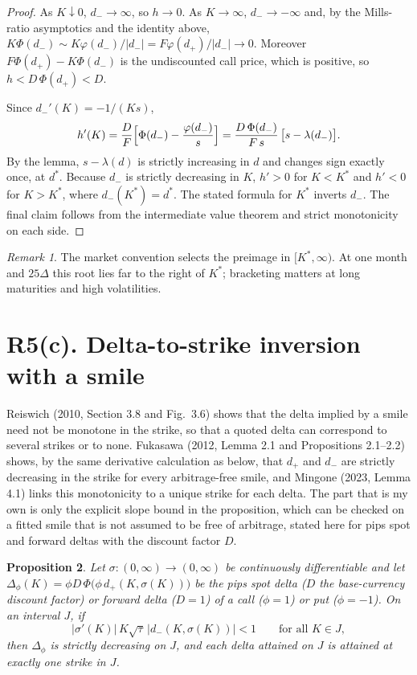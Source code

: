 \documentclass[11pt]{article}
\newtheorem{proposition}{Proposition}
\theoremstyle{remark}
\newtheorem{remark}[proposition]{Remark}
\begin{document}
\begin{proof}
As $K\downarrow0$, $d_-\to\infty$, so $h\to0$. As $K\to\infty$, $d_-\to-\infty$ and, by the Mills-ratio asymptotics and the identity above, $K\Phi(d_-)\sim K\varphi(d_-)/|d_-|=F\varphi(d_+)/|d_-|\to0$. Moreover $F\Phi(d_+)-K\Phi(d_-)$ is the undiscounted call price, which is positive, so $h<D\,\Phi(d_+)<D$.

Since $d_-'(K)=-1/(Ks)$,
\[
h'(K)=\frac{D}{F}\Bigl[\Phi(d_-)-\frac{\varphi(d_-)}{s}\Bigr]=\frac{D\,\Phi(d_-)}{F\,s}\,\bigl[s-\lambda(d_-)\bigr].
\]
By the lemma, $s-\lambda(d)$ is strictly increasing in $d$ and changes sign exactly once, at $d^*$. Because $d_-$ is strictly decreasing in $K$, $h'>0$ for $K<K^*$ and $h'<0$ for $K>K^*$, where $d_-(K^*)=d^*$. The stated formula for $K^*$ inverts $d_-$. The final claim follows from the intermediate value theorem and strict monotonicity on each side.
\end{proof}

\begin{remark}
The market convention selects the preimage in $[K^*,\infty)$. At one month and $25\Delta$ this root lies far to the right of $K^*$; bracketing matters at long maturities and high volatilities.
\end{remark}

\section*{R5(c). Delta-to-strike inversion with a smile}

Reiswich (2010, Section 3.8 and Fig.~3.6) shows that the delta implied by a smile need not be monotone in the strike, so that a quoted delta can correspond to several strikes or to none. Fukasawa (2012, Lemma 2.1 and Propositions 2.1--2.2) shows, by the same derivative calculation as below, that $d_+$ and $d_-$ are strictly decreasing in the strike for every arbitrage-free smile, and Mingone (2023, Lemma 4.1) links this monotonicity to a unique strike for each delta. The part that is my own is only the explicit slope bound in the proposition, which can be checked on a fitted smile that is not assumed to be free of arbitrage, stated here for pips spot and forward deltas with the discount factor $D$.

\begin{proposition}
Let $\sigma:(0,\infty)\to(0,\infty)$ be continuously differentiable and let $\Delta_\phi(K)=\phi D\,\Phi\bigl(\phi\,d_+(K,\sigma(K))\bigr)$ be the pips spot delta ($D$ the base-currency discount factor) or forward delta ($D=1$) of a call ($\phi=1$) or put ($\phi=-1$). On an interval $J$, if
\[
|\sigma'(K)|\,K\sqrt\tau\,|d_-(K,\sigma(K))|<1\qquad\text{for all }K\in J,
\]
then $\Delta_\phi$ is strictly decreasing on $J$, and each delta attained on $J$ is attained at exactly one strike in $J$.
\end{proposition}
\end{document}
